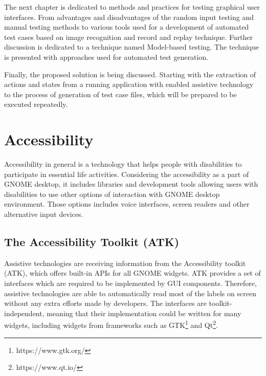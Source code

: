 The next chapter is dedicated to methods and practices for testing graphical user interfaces. From advantages and disadvantages of the random input testing and manual testing methods to various tools used for a development of automated test cases based on image recognition and record and replay technique. Further discussion is dedicated to a technique named Model-based testing. The technique is presented with approaches used for automated test generation. 

Finally, the proposed solution is being discussed. Starting with the extraction of actions and states from a running application with enabled assistive technology to the process of generation of test case files, which will be prepared to be executed repeatedly.



\chapter{Accessibility}
Accessibility in general is a technology that helps people with disabilities to participate in essential life activities. Considering the accessibility as a part of GNOME desktop, it includes libraries and development tools allowing users with disabilities to use other options of interaction with GNOME desktop environment. Those options includes voice interfaces, screen readers and other alternative input devices.\cite{gnomeADG}
\section{The Accessibility Toolkit (ATK)}
Assistive technologies are receiving information from the Accessibility toolkit (ATK), which offers built-in APIs for all GNOME widgets. ATK provides a set of interfaces which are required to be implemented by GUI components. Therefore, assistive technologies are able to automatically read most of the labels on screen without any extra efforts made by developers. The interfaces are toolkit-independent, meaning that their implementation could be written for many widgets, including widgets from frameworks such as GTK\footnote{https://www.gtk.org/} and Qt\footnote{https://www.qt.io/}.
